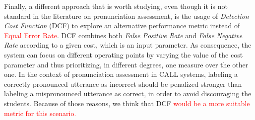 Finally, a different approach
that is worth studying, even though it is not standard in the literature
on pronunciation assessment,
is the usage of \textit{Detection Cost Function} (DCF) %
to explore an alternative performance metric
instead of \textcolor{red}{Equal Error Rate}.
DCF combines both \textit{False Positive Rate} and \textit{False Negative Rate}
according to a given cost, which is an input parameter.
As consequence, the system can focus on different operating points
by varying the value of the cost parameter and thus prioritizing,
in different degrees, one measure over the other one.
In the context of pronunciation assessment in
CALL systems, labeling a correctly pronounced utterance as incorrect should be
penalized stronger than labeling a mispronounced utterance as correct, in order
to avoid discouraging the students. Because of those reasons,
we think that DCF
\textcolor{red}{would be a more suitable metric for this scenario.}
